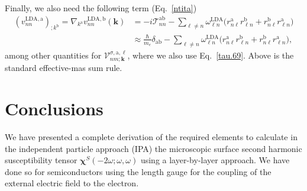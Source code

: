 Finally,
we also need the following term (Eq.~\eqref{ntita})
\begin{align}\label{a.3c}
(v^{\mathrm{LDA},\mathrm{a}}_{nn})_{;k^\mathrm{b}}
=
\nabla_{k^{\mathrm{a}}}  
v^{\mathrm{LDA},\mathrm{b}}_{nn}(\mathbf{k})
&=
-i\mathcal{T}^{\mathrm{a}\mathrm{b}}_{nn}
-
\sum_{\ell\ne n}
\omega^{\mathrm{LDA}}_{\ell n}
\bigg(  
r^{\mathrm{a}}_{n\ell}  
r^{\mathrm{b}}_{\ell n}
+  
r^{\mathrm{b}}_{n\ell}  
r^{\mathrm{a}}_{\ell n}
\bigg)
\nonumber\\
&\approx
\frac{\hbar}{m_{e}}\delta_{\mathrm{a}\mathrm{b}}
-
\sum_{\ell\ne n}
\omega^{\mathrm{LDA}}_{\ell n}
\bigg(  
r^{\mathrm{a}}_{n\ell}  
r^{\mathrm{b}}_{\ell n}
+  
r^{\mathrm{b}}_{n\ell}  
r^{\mathrm{a}}_{\ell n}
\bigg)
,
\end{align}  
among other quantities for $\mathcal{V}^{\sigma,\mathrm{a},\ell}_{nm;\mathbf{k}}$, where we 
also use Eq.~\eqref{tau.69}. Above is the standard effective-mas sum rule.
\cite{ashcroftbook} 


\section{Conclusions}\label{con}

We have presented a complete derivation of the required elements to
calculate in the independent particle approach (IPA) the microscopic  
surface second harmonic susceptibility tensor $\boldsymbol{\chi}^S(-2\omega;\omega,\omega)$ 
using a layer-by-layer approach. We have done so for semiconductors using 
the length gauge for the coupling of the external electric field to the 
electron. 
